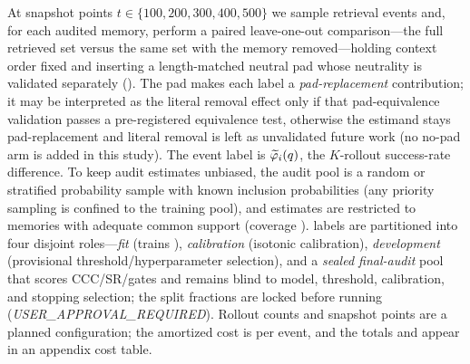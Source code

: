 At snapshot points $t \in \{100, 200, 300, 400, 500\}$ we sample retrieval events
and, for each audited memory, perform a paired leave-one-out comparison---the full
retrieved set versus the same set with the memory removed---holding context order
fixed and inserting a length-matched neutral pad whose neutrality is validated
separately (). The pad makes each label a
\emph{pad-replacement} contribution; it may be interpreted as the literal removal
effect only if that pad-equivalence validation passes a pre-registered equivalence
test, otherwise the estimand stays pad-replacement and literal removal is left as
unvalidated future work (no no-pad arm is added in this study). The event label is
$\widetilde{\varphi}_i(q)$, the $K$-rollout success-rate difference. To keep audit estimates
unbiased, the audit pool is a random or stratified probability sample with known
inclusion probabilities (any priority sampling is confined to the training pool),
and estimates are restricted to memories with adequate common support (coverage
). \rit{} labels are partitioned into four
disjoint roles---\emph{fit} (trains \aca{}), \emph{calibration} (isotonic
calibration), \emph{development} (provisional threshold/hyperparameter selection),
and a \emph{sealed final-audit} pool that scores CCC/SR/gates and remains blind to
model, threshold, calibration, and stopping selection; the split fractions are
locked before running (\emph{USER\_APPROVAL\_REQUIRED}). Rollout counts and snapshot
points are a planned configuration; the amortized cost is
 per
event, and the totals  and
 appear in an appendix cost table.

